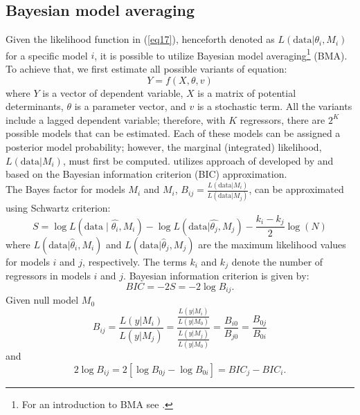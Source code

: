 \documentclass[a4paper]{article}
\begin{document}
\subsection{Bayesian model averaging}\label{bma}
\noindent Given the likelihood function in (\ref{eq17}), henceforth denoted as $L(\text{data}|\theta_{i}, M_{i})$ for a specific model $i$, it is possible to utilize Bayesian model averaging\footnote{For an introduction to BMA see \citet{Raftery+1995,Raftery+1997,Kass+1995b,Doppelhofer+2009,amini2011bayesian,Beck+2017,Fragoso+2018}.} (BMA).
To achieve that, we first estimate all possible variants of equation:
\begin{equation}\label{eq19}
   Y=f(X,\theta,v)
\end{equation}
\noindent where $Y$ is a vector of dependent variable, $X$ is a matrix of potential determinants, $\theta$ is a parameter vector, and $v$ is a stochastic term.
All the variants include a lagged dependent variable; therefore, with $K$ regressors, there are $2^{K}$ possible models that can be estimated.
Each of these models can be assigned a posterior model probability; however, the marginal (integrated) likelihood, $L(\text{data}|M_{i})$, must first be computed.
\citet{Moral+2012} utilizes approach of developed by \citet{Raftery+1995} and \citet{Sala+2004} based on the Bayesian information criterion (BIC) approximation.\\
\indent The Bayes factor for models $M_{i}$ and $M_{i}$, $B_{ij}=\frac{L(\text{data}|M_{i})}{L(\text{data}|M_{j})}$, can be approximated using Schwartz criterion:
\begin{equation}\label{eq20}
S=\log L(\text{data} \mid\hat{\theta_{i}},M_{i})-\log L(\text{data}|\hat{\theta_{j}},M_{j})-\frac{k_{i}-k_{j}}{2}\log (N)
\end{equation}
where $L(\text{data}|\hat{\theta}_{i}, M_{i})$ and $L(\text{data}|\hat{\theta}_{j}, M_{j})$ are the maximum likelihood values for models $i$ and $j$, respectively.
The terms $k_{i}$ and $k_{j}$ denote the number of regressors in models $i$ and $j$.
Bayesian information criterion is given by:
\begin{equation}\label{eq21}
    BIC=-2S=-2\log B_{ij}.
\end{equation}
Given null model $M_{0}$
\begin{equation}\label{eq22}
B_{ij}=\frac{L(y|M_{i})}{L(y|M_{j})}=\frac{\frac{L(y|M_{i})}{L(y|M_{0})}}{\frac{L(y|M_{j})}{L(y|M_{0})}}=\frac{B_{i0}}{B_{j0}}=\frac{B_{0j}}{B_{0i}}
\end{equation}
and
\begin{equation}\label{eq23}
2\log B_{ij}=2[\log B_{0j} - \log B_{0i}]=BIC_{j}-BIC_{i}.
\end{equation}
\end{document}

